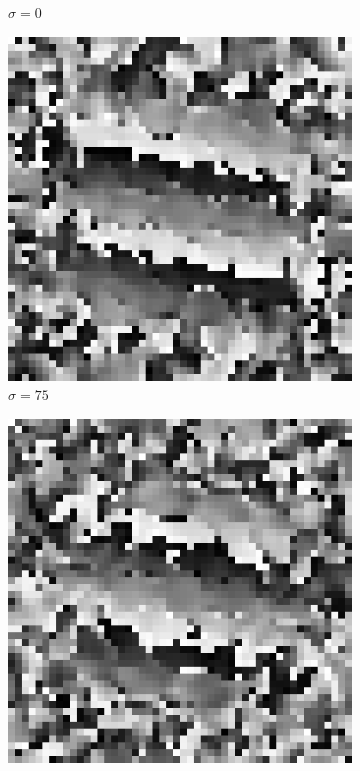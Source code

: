 \begin{figure}[htpb]
\begin{subfigure}{.25\textwidth}
\caption{$\sigma = 0$}
\end{subfigure}%
\begin{subfigure}{.25\textwidth}
\includegraphics[width=1\textwidth]{img/PhaseDifferenceSigma75}
\caption{$\sigma = 75$}
\end{subfigure}%
\begin{subfigure}{.25\textwidth}
\includegraphics[width=1\textwidth]{img/PhaseDifferenceSigma150}

\end{subfigure}
\end{figure}
